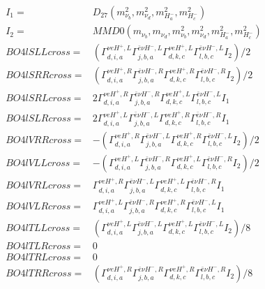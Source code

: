 \documentclass[A4,landscape]{article}
\begin{document}
\begin{align} 
I_1 = & D_{27}(m^2_{\nu_{{b}}}, m^2_{\nu_{{d}}}, m^2_{H^-_{{a}}}, m^2_{H^-_{{c}}}) \\ 
I_2 = & MMD0(m_{\nu_{{b}}}, m_{\nu_{{d}}}, m^2_{\nu_{{b}}}, m^2_{\nu_{{d}}}, m^2_{H^-_{{a}}}, m^2_{H^-_{{c}}}) \\ 
  BO4lSLLcross= & ( \Gamma^{\nu e H^+,L}_{d, i, a} \Gamma^{\bar{e}\nu H^- ,L}_{j, b, a} \Gamma^{\nu e H^+,L}_{d, k, c} \Gamma^{\bar{e}\nu H^- ,L}_{l, b, c} I_2)/2 \\ 
  BO4lSRRcross= & ( \Gamma^{\nu e H^+,R}_{d, i, a} \Gamma^{\bar{e}\nu H^- ,R}_{j, b, a} \Gamma^{\nu e H^+,R}_{d, k, c} \Gamma^{\bar{e}\nu H^- ,R}_{l, b, c} I_2)/2 \\ 
  BO4lSRLcross= & 2  \Gamma^{\nu e H^+,R}_{d, i, a} \Gamma^{\bar{e}\nu H^- ,R}_{j, b, a} \Gamma^{\nu e H^+,L}_{d, k, c} \Gamma^{\bar{e}\nu H^- ,L}_{l, b, c} I_1 \\ 
  BO4lSLRcross= & 2  \Gamma^{\nu e H^+,L}_{d, i, a} \Gamma^{\bar{e}\nu H^- ,L}_{j, b, a} \Gamma^{\nu e H^+,R}_{d, k, c} \Gamma^{\bar{e}\nu H^- ,R}_{l, b, c} I_1 \\ 
  BO4lVRRcross= & -( \Gamma^{\nu e H^+,R}_{d, i, a} \Gamma^{\bar{e}\nu H^- ,L}_{j, b, a} \Gamma^{\nu e H^+,R}_{d, k, c} \Gamma^{\bar{e}\nu H^- ,L}_{l, b, c} I_2)/2 \\ 
  BO4lVLLcross= & -( \Gamma^{\nu e H^+,L}_{d, i, a} \Gamma^{\bar{e}\nu H^- ,R}_{j, b, a} \Gamma^{\nu e H^+,L}_{d, k, c} \Gamma^{\bar{e}\nu H^- ,R}_{l, b, c} I_2)/2 \\ 
  BO4lVRLcross= &  \Gamma^{\nu e H^+,R}_{d, i, a} \Gamma^{\bar{e}\nu H^- ,L}_{j, b, a} \Gamma^{\nu e H^+,L}_{d, k, c} \Gamma^{\bar{e}\nu H^- ,R}_{l, b, c} I_1 \\ 
  BO4lVLRcross= &  \Gamma^{\nu e H^+,L}_{d, i, a} \Gamma^{\bar{e}\nu H^- ,R}_{j, b, a} \Gamma^{\nu e H^+,R}_{d, k, c} \Gamma^{\bar{e}\nu H^- ,L}_{l, b, c} I_1 \\ 
  BO4lTLLcross= & ( \Gamma^{\nu e H^+,L}_{d, i, a} \Gamma^{\bar{e}\nu H^- ,L}_{j, b, a} \Gamma^{\nu e H^+,L}_{d, k, c} \Gamma^{\bar{e}\nu H^- ,L}_{l, b, c} I_2)/8 \\ 
  BO4lTLRcross= & 0 \\ 
  BO4lTRLcross= & 0 \\ 
  BO4lTRRcross= & ( \Gamma^{\nu e H^+,R}_{d, i, a} \Gamma^{\bar{e}\nu H^- ,R}_{j, b, a} \Gamma^{\nu e H^+,R}_{d, k, c} \Gamma^{\bar{e}\nu H^- ,R}_{l, b, c} I_2)/8 \\ 
\end{align} 
\end{document}
